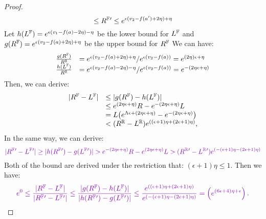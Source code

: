 \documentclass[a4paper,11pt]{article}
\begin{document}
\begin{proof}
{$$		\leq R^{\mathbb{F}}{'} \leq
		e^{\epsilon 
		(v_2 - f(a') + 2\eta) + \eta}$$
%
		Let  
		$h{(L^{\mathbb{F}}) } = e^{\epsilon 
		 (v_1 - f(a) - 2\eta) - \eta}$ 
		 be the lower bound for $L^{\mathbb{F}}$
		and $g(R^{\mathbb{F}}) = e^{\epsilon 
		(v_2 - f(a) + 2\eta) + \eta}$ 
		be the upper bound for $R^{\mathbb{F}}$
		We can have:
		\[
		\begin{array}{ll}
		\frac{g(\fvalR)}{\rvarR} 
		& = e^{\epsilon 
		(\valv_2 - f(a) + 2\eta) + \eta}/e^{\epsilon(\valv_2 - f(a))}
		 =
		e^{ 
		(2\eta)\epsilon + \eta}
		\\
%
		\frac{h(\fvalL )}{\rvarR} 
		& = e^{\epsilon 
		(\valv_2 - f(a) - 2\eta) - \eta}/e^{\epsilon(\valv_2 - f(a))}
		 =
		e^{ 
		-(2\eta\epsilon + \eta)}
		\end{array}
		\]
		Then, we can derive:
		\[
		\begin{array}{ll}
		|R^{\mathbb{F}} - L^{\mathbb{F}}|
		& \leq |g(R^{\mathbb{F}} ) - h(L^{\mathbb{F}} )| \\
		& \leq e^{ 
		(2\eta \epsilon + \eta)}R - 
		e^{-(2\eta\epsilon + \eta)} L \\
		& = L \big(  e^{ \Lambda\epsilon + (2\eta \epsilon + \eta)} 
		- e^{-(2\eta \epsilon + \eta)} \big)\\
		& < (R^{\mathbb{R}} - L^{\mathbb{R}})
		e^{((\epsilon + 1) \eta + (2 \epsilon + 1) \eta)},
		\end{array}
		\]
		In the same way, we can derive:
		\[
		\extend{
		|\fvarR{'} - \fvalL{'}|
		\geq 
		|h(\fvalR{'} ) - g(\fvalL{'} )|
		 > e^{-(2\eta \epsilon + \eta)} R 
		 - e^{(2\eta \epsilon + \eta)} L
		> (\rvalR{'} - \rvalL{'})
		e^{(-(\epsilon + 1) \eta - (2 \epsilon + 1) \eta)}
		}
		\]
		Both of the bound are derived under the restriction that: $(\epsilon + 1) \eta \leq 1$.
		Then we have:
		\[
		\extend{
		e^0 \leq 
		\frac{|\fvalR - \fvalL |}
		{|\fvalR{'} - \fvalL{'}|}
		\leq
		\frac{|g(\fvalR ) - h(\fvalL )|}
		{|h(\fvalR{'} ) - g(\fvalL{'} )|}
		\leq 
		\frac{e^{((\epsilon + 1) \eta + (2 \epsilon + 1) \eta)}}
		{e^{(-(\epsilon + 1) \eta - (2 \epsilon + 1) \eta)}}
		=
		\left(
		e^{(6 \epsilon + 4) \eta + \epsilon}
		\right).
		}		
		\]
		}
%
\end{proof}




\newpage


\end{document}
